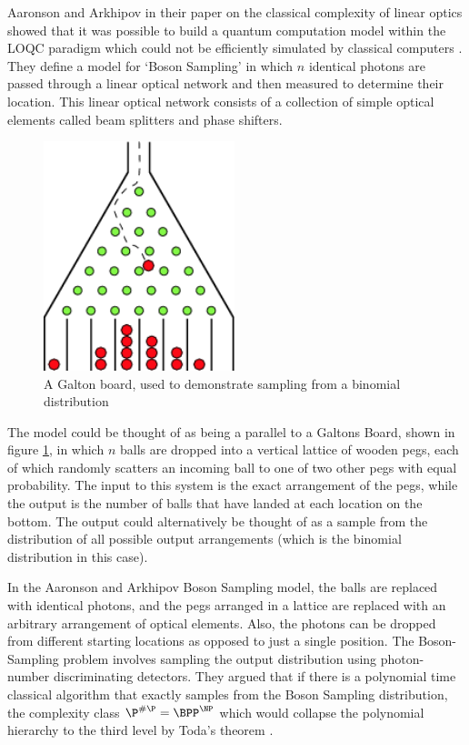 \documentclass[ %
                    author={Manan Vaswani},
                supervisor={Dr. Raphael Clifford},
                    degree={MEng},
                     title={A multi-core CPU implementation \n of the classical Boson Sampling algorithm},
                  subtitle={},
                      type={},
                      year={2019} ]{dissertation}
\begin{document}
Aaronson and Arkhipov in their paper on the classical complexity of linear optics showed that it was possible to build a quantum computation model within the LOQC paradigm which could not be efficiently simulated by classical computers \cite{aaronson2011}. They define a model for `Boson Sampling' in which $n$ identical photons are passed through a linear optical network and then measured to determine their location. This linear optical network consists of a collection of simple optical elements called beam splitters and phase shifters.

\begin{figure}
	\centering
  \includegraphics[width=15em]{galton_board}
  \caption{A Galton board, used to demonstrate sampling from a binomial distribution \cite{galton_board}}
  \label{fig:galton_board}
\end{figure}

The model could be thought of as being a parallel to a Galtons Board, shown in figure \ref{fig:galton_board}, in which $n$ balls are dropped into a vertical lattice of wooden pegs, each of which randomly scatters an incoming ball to one of two other pegs with equal probability. The input to this system is the exact arrangement of the pegs, while the output is the number of balls that have landed at each location on the bottom. The output could alternatively be thought of as a sample from the distribution of all possible output arrangements (which is the binomial distribution in this case).

In the Aaronson and Arkhipov Boson Sampling model, the balls are replaced with identical photons, and the pegs arranged in a lattice are replaced with an arbitrary arrangement of optical elements. Also, the photons can be dropped from different starting locations as opposed to just a single position. The Boson-Sampling problem involves sampling the output distribution using photon-number discriminating detectors. They argued that if there is a polynomial time classical algorithm that exactly samples from the Boson Sampling distribution, the complexity class $\P^{\#\P} = \BPP^{\NP} $  which would collapse the polynomial hierarchy to the third level by Toda's theorem \cite{toda1991}.
\end{document}
